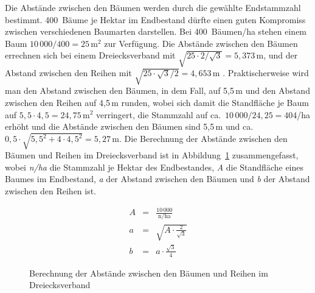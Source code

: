 \documentclass[twocolumn]{scrartcl}
\begin{document}
Die Abstände zwischen den Bäumen werden durch die gewählte Endstammzahl
bestimmt. 400~Bäume je Hektar im Endbestand dürfte einen guten Kompromiss
zwischen verschiedenen Baumarten darstellen. Bei 400~Bäumen/ha stehen einem Baum
$10\,000 / 400 = 25\,\text{m}^2$ zur Verfügung. Die Abstände zwischen den Bäumen
errechnen sich bei einem Dreiecksverband mit $\sqrt{25 \cdot 2 / \sqrt{3}} =
5,373\,\text{m}$, und der Abstand zwischen den Reihen mit $\sqrt{25 \cdot
\sqrt{3} / 2} = 4,653\,\text{m}$ . Praktischerweise wird man den Abstand
zwischen den Bäumen, in dem Fall, auf 5,5\,m und den Abstand zwischen den Reihen
auf 4,5\,m runden, wobei sich damit die Standfläche je Baum auf $5,5 \cdot 4,5 =
24,75\,\text{m}^2$ verringert, die Stammzahl auf ca.\ $10\,000 / 24,25 = 404$/ha
erhöht und die Abstände zwischen den Bäumen sind 5,5\,m und ca.\ $0,5\cdot
\sqrt{5,5^2 + 4\cdot 4,5^2} = 5,27$\,m. Die Berechnung der Abstände zwischen den
Bäumen und Reihen im Dreiecksverband ist in
Abbildung~\ref{fig:dreiecksverbandEqu} zusammengefasst, wobei \emph{n/ha} die
Stammzahl je Hektar des Endbestandes, \emph{A} die Standfläche eines Baumes im
Endbestand, \emph{a} der Abstand zwischen den Bäumen und \emph{b} der Abstand
zwischen den Reihen ist.

\begin{figure}[htbp]
  \centering
\begin{minipage}{.35\columnwidth}
\end{minipage}%
\begin{minipage}{.63\columnwidth}%
  \begin{eqnarray*}%
    A & = & \frac{10\,000}{\text{n/ha}}\\
    a & = & \sqrt{A \cdot \frac{2}{\sqrt{3}}}\\
    b & = & a \cdot \frac{\sqrt{3}}{4}
  \end{eqnarray*}%
\end{minipage}
\caption{Berechnung der Abstände zwischen den Bäumen und Reihen im Dreiecksverband}
\label{fig:dreiecksverbandEqu}
\end{figure}
\end{document}
